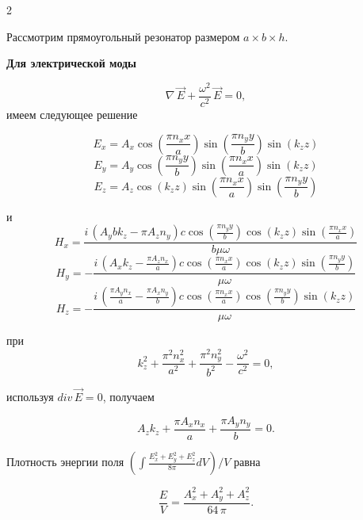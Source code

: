 \documentclass[twoside, 10pt]{article}
\begin{document}
\begin{multicols}{2}

\setcounter{equation}{0}
\renewcommand{\theequation}{B.\arabic{equation}}

    Рассмотрим прямоугольный резонатор размером \(a \times b \times h\).

    \textbf{Для электрической моды}

\begin{equation}\nabla\,\vec{E} + \frac{\omega^2}{c^2}\,\vec{E} = 0,\end{equation} имеем следующее решение

\[E_{x} = A_{x} \cos\left(\frac{\pi n_{x} x}{a}\right) \sin\left(\frac{\pi n_{y} y}{b}\right) \sin\left(k_{z} z\right)\]
\[E_{y} = A_{y} \cos\left(\frac{\pi n_{y} y}{b}\right) \sin\left(\frac{\pi n_{x} x}{a}\right) \sin\left(k_{z} z\right)\]
\[E_{z} = A_{z} \cos\left(k_{z} z\right) \sin\left(\frac{\pi n_{x} x}{a}\right) \sin\left(\frac{\pi n_{y} y}{b}\right)\]

и
\[H_{x} = \frac{i \, {\left(A_{y} b k_{z} - \pi A_{z} n_{y}\right)} c \cos\left(\frac{\pi n_{y} y}{b}\right) \cos\left(k_{z} z\right) \sin\left(\frac{\pi n_{x} x}{a}\right)}{b \mu \omega}\]
\[H_{y} = -\frac{i \, {\left(A_{x} k_{z} - \frac{\pi A_{z} n_{x}}{a}\right)} c \cos\left(\frac{\pi n_{x} x}{a}\right) \cos\left(k_{z} z\right) \sin\left(\frac{\pi n_{y} y}{b}\right)}{\mu \omega}\]
\[H_{z} = -\frac{i \, {\left(\frac{\pi A_{y} n_{x}}{a} - \frac{\pi A_{x} n_{y}}{b}\right)} c \cos\left(\frac{\pi n_{x} x}{a}\right) \cos\left(\frac{\pi n_{y} y}{b}\right) \sin\left(k_{z} z\right)}{\mu \omega}\]

при
\begin{equation}k_{z}^{2} + \frac{\pi^{2} n_{x}^{2}}{a^{2}} + \frac{\pi^{2} n_{y}^{2}}{b^{2}} - \frac{\omega^{2}}{c^{2}} = 0,\end{equation}

используя \(div\,\vec{E} = 0\), получаем

\begin{equation}A_{z} k_{z} + \frac{\pi A_{x} n_{x}}{a} + \frac{\pi A_{y} n_{y}}{b} = 0.\end{equation}

Плотность энергии поля
\(\left(\int \frac{E_x^2+E_y^2+E_z^2}{8 \pi}dV\right)\big/{V}\) равна

\begin{equation}\frac{E}{V} = \frac{{A_{x}^{2} + A_{y}^{2} + A_{z}^{2}} }{64 \, \pi}.\end{equation}


\end{multicols}
\end{document}
